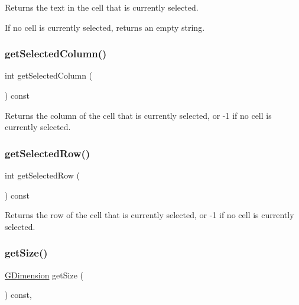 Returns the text in the cell that is currently selected. 

If no cell is currently selected, returns an empty string. \mbox{\label{classGTable_abeec6fda3c331aa187ba1b695b19d435}} 
\subsubsection{\texorpdfstring{get\+Selected\+Column()}{getSelectedColumn()}}
{\footnotesize\ttfamily int get\+Selected\+Column (\begin{DoxyParamCaption}{ }\end{DoxyParamCaption}) const\hspace{0.3cm}{\ttfamily [virtual]}}



Returns the column of the cell that is currently selected, or -\/1 if no cell is currently selected. 

\mbox{\label{classGTable_adeb0b39683825191a8216d6cc3ca5072}} 
\subsubsection{\texorpdfstring{get\+Selected\+Row()}{getSelectedRow()}}
{\footnotesize\ttfamily int get\+Selected\+Row (\begin{DoxyParamCaption}{ }\end{DoxyParamCaption}) const\hspace{0.3cm}{\ttfamily [virtual]}}



Returns the row of the cell that is currently selected, or -\/1 if no cell is currently selected. 

\mbox{\label{classGInteractor_a7b4eec96a2bdc6420695d5796a78eea9}} 
\subsubsection{\texorpdfstring{get\+Size()}{getSize()}}
{\footnotesize\ttfamily \mbox{\hyperlink{structGDimension}{G\+Dimension}} get\+Size (\begin{DoxyParamCaption}{ }\end{DoxyParamCaption}) const\hspace{0.3cm}{\ttfamily [virtual]}, {\ttfamily [inherited]}}



